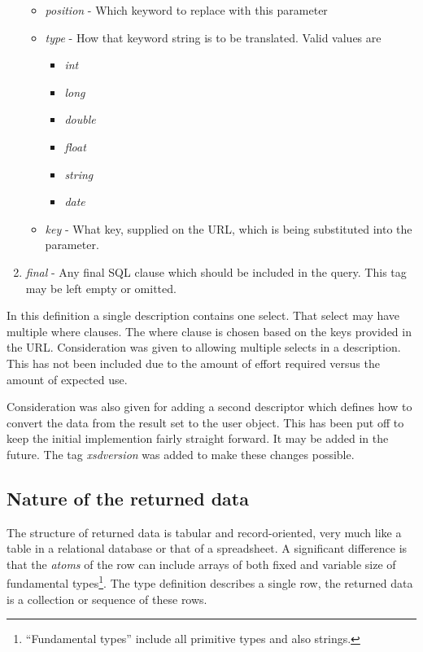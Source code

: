 \begin{enumerate}
\begin{itemize}
\item \emph{position} - Which keyword to replace with this parameter
\item \emph{type} - How that keyword string is to be translated.  Valid values are
\begin{itemize}
\item \emph{int}
\item \emph{long}
\item \emph{double}
\item \emph{float}
\item \emph{string}
\item \emph{date}
\end{itemize}
\item \emph{key} - What key, supplied on the URL, which is being substituted into the parameter.
\end{itemize}
\item \emph{final} - Any final SQL clause which should be included in the query.  This tag may
be left empty or omitted.

\end{enumerate}

In this definition a single description contains one select.  That select may have multiple where
clauses.  The where clause is chosen based on the keys provided in the URL.  Consideration was given
to allowing multiple selects in a description.  This has not been included due to the amount of 
effort required versus the amount of expected use.  

Consideration was also given for adding a second descriptor which defines how to convert the data
from the result set to the user object.  This has been put off to keep the initial implemention
fairly straight forward.  It may be added in the future.  The tag \emph{xsdversion} was added to 
make these changes possible.


\subsection{Nature of the returned data}

The structure of returned data is tabular and
record-oriented, very much like a table in a relational database or that
of a spreadsheet.
A significant difference is that the \emph{atoms} of the row can include
arrays of both fixed and variable size of fundamental \cpp
types\footnote{``Fundamental types'' include all primitive types and
also strings.}.  The type definition describes a single row, the
returned data is a collection or sequence of these rows.

